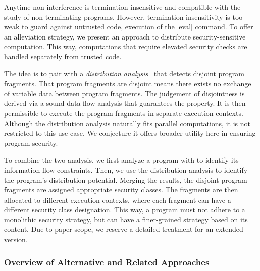Anytime non-interference
is termination-insensitive
and compatible with the study of non-terminating programs. However, termination-insensitivity is too
weak to guard against untrusted code, \eg execution of the \prc|eval| command.
To offer an alleviation strategy, we present an approach to distribute
security-sensitive computation. This way, computations that require elevated
security checks are handled separately from trusted code.

The idea is to pair \lname with a \emph{distribution
analysis}~\cite{aubert20232} that detects disjoint program fragments. That
program fragments are disjoint means there exists no exchange of variable data
between program fragments. The judgement of disjointness is derived via a sound
data-flow analysis that guarantees the property. It is then permissible to
execute the program fragments in separate execution contexts. Although the
distribution analysis naturally fits parallel computations, it is not restricted
to this use case. We conjecture it offers broader utility here in ensuring
program security.

To combine the two analysis, we first analyze a program with \lname to identify
its information flow constraints. Then, we use the distribution analysis to
identify the program's distribution potential. Merging the results, the disjoint
program fragments are assigned appropriate security classes. The fragments are
then allocated to different execution contexts, where each fragment can have a
different security class designation. This way, a program must not adhere to a
monolithic security strategy, but can have a finer-grained strategy based on its
content. Due to paper scope, we reserve a detailed treatment for an extended
version.

\subsubsection{Overview of Alternative and Related Approaches}\label{sec:ni-related-works}

